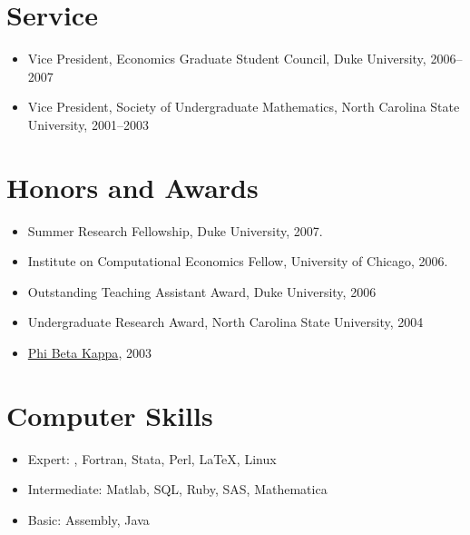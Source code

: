 \documentclass[overlapped,line,letterpaper]{res}
\begin{document}
\begin{resume}

%


\section{\bf Service}

\begin{itemize}
\item Vice President, Economics Graduate Student Council, Duke University,
  2006--2007
\item Vice President, Society of Undergraduate Mathematics, North Carolina
  State University, 2001--2003
\end{itemize}


\section{\bf Honors and Awards}
\begin{itemize}
\item Summer Research Fellowship, Duke University, 2007.
\item Institute on Computational Economics Fellow, University of Chicago, 2006.
\item Outstanding Teaching Assistant Award, Duke University, 2006
\item Undergraduate Research Award, North Carolina State University, 2004
\item \href{http://www.pbk.org/}{Phi Beta Kappa}, 2003
\end{itemize}

\section{\bf Computer Skills}

\begin{itemize}
\item Expert: \Cplusplus, Fortran, Stata, Perl, \LaTeX, Linux
\item Intermediate: Matlab, SQL, Ruby, SAS, Mathematica
\item Basic: Assembly, Java
\end{itemize}

\end{resume}
\end{document}
